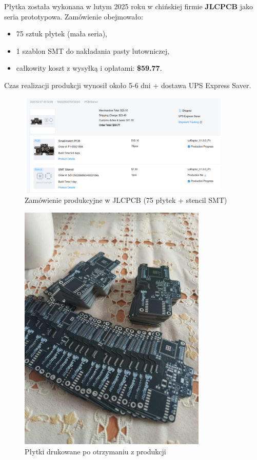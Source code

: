 Płytka została wykonana w lutym 2025 roku w chińskiej firmie \textbf{JLCPCB} jako seria prototypowa. Zamówienie obejmowało:
\begin{itemize}
	\item 75 sztuk płytek (mała seria),
	\item 1 szablon SMT do nakładania pasty lutowniczej,
	\item całkowity koszt z wysyłką i opłatami: \textbf{\$59.77}.
\end{itemize}
Czas realizacji produkcji wynosił około 5-6 dni + dostawa UPS Express Saver.
\begin{figure}[htbp]
\centering
	\includegraphics[width=0.9\textwidth]{root/pcb_order_screenshot.png}
	\caption{Zamówienie produkcyjne w JLCPCB (75 płytek + stencil SMT)}
\end{figure}

\clearpage
\begin{figure}[htbp]
	\centering
	\includegraphics[width=0.8\textwidth]{root/pcb_batch.jpg}
	\caption{Płytki drukowane po otrzymaniu z produkcji}
\end{figure}

